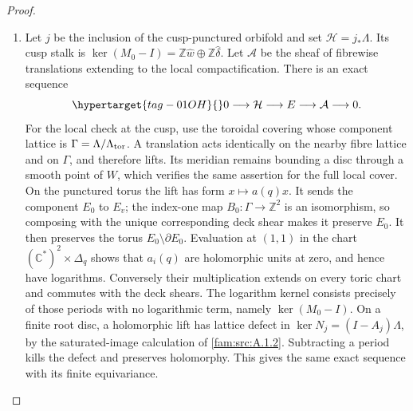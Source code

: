 \begin{proof}
\begin{enumerate}[label=\arabic*.,leftmargin=*]
\item Let $j$ be the
inclusion of the cusp-punctured orbifold and set
$\mathcal H=j_*\Lambda$.  Its cusp stalk is
$\ker(M_0-I)=\mathbb Z\widehat w\oplus\mathbb Z\widehat\delta$.
Let $\mathcal A$ be the sheaf of fibrewise translations extending to
the local compactification.  There is an exact sequence
\begin{equation}\hypertarget{tag-01OH}{}\label{eq:P5exponential}
0\longrightarrow\mathcal H\longrightarrow E\longrightarrow\mathcal A
\longrightarrow0.
\end{equation}
For the local check at the cusp, use the toroidal covering whose
component lattice is $\Gamma=\Lambda/\Lambda_{\rm tor}$.  A translation
acts identically on the nearby fibre lattice and on $\Gamma$, and
therefore lifts.  Its meridian remains bounding a disc through a smooth
point of $W$, which verifies the same assertion for the full local
cover.  On the punctured torus the lift has form $x\mapsto a(q)x$.
It sends the component $E_0$ to $E_v$; the index-one map
$B_0:\Gamma\to\mathbb Z^2$ is an isomorphism, so composing with the
unique corresponding deck shear makes it preserve $E_0$.  It then
preserves the torus $E_0\setminus\partial E_0$.  Evaluation at $(1,1)$
in the chart $(\mathbb C^*)^2\times\Delta_q$ shows that $a_i(q)$ are
holomorphic units at zero, and hence have logarithms.  Conversely their
multiplication extends on every toric chart and commutes with the deck
shears.  The logarithm kernel consists precisely of those periods with
no logarithmic term, namely $\ker(M_0-I)$.  On a finite root disc, a holomorphic lift has lattice defect in
$\ker N_j=(I-A_j)\Lambda$, by the saturated-image calculation
of \cref{fam:src:A.1.2}. Subtracting a period kills the defect
and preserves holomorphy. This gives the same exact sequence
with its finite equivariance.


\end{enumerate}
\end{proof}
